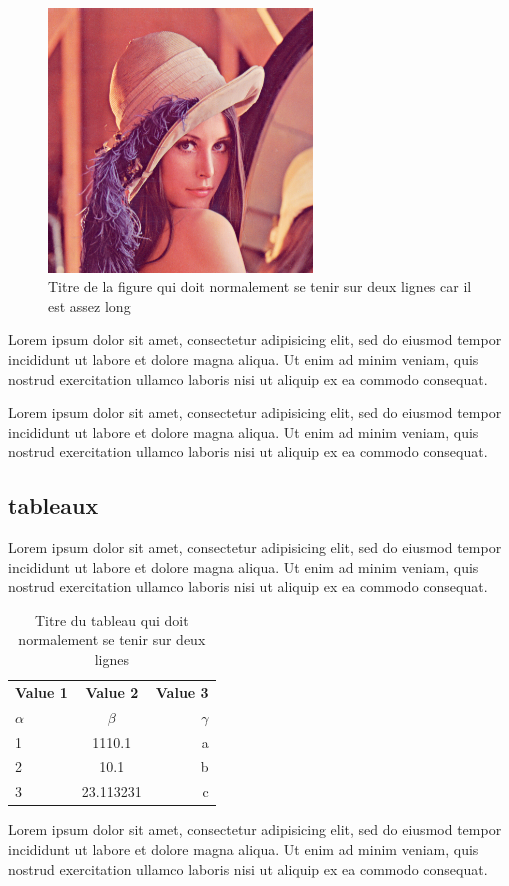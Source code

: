 \begin{figure}[H]
 \centering
 \includegraphics[width=7cm]{lenna.png}
 \caption{Titre de la figure qui doit normalement se tenir sur deux lignes car il est assez long}
 \label{fig:figure1}
\end{figure}

Lorem ipsum dolor sit amet, consectetur adipisicing elit, sed do eiusmod
tempor incididunt ut labore et dolore magna aliqua. Ut enim ad minim veniam,
quis nostrud exercitation ullamco laboris nisi ut aliquip ex ea commodo
consequat.

Lorem ipsum dolor sit amet, consectetur adipisicing elit, sed do eiusmod
tempor incididunt ut labore et dolore magna aliqua. Ut enim ad minim veniam,
quis nostrud exercitation ullamco laboris nisi ut aliquip ex ea commodo
consequat.

\subsection{tableaux}   

Lorem ipsum dolor sit amet, consectetur adipisicing elit, sed do eiusmod
tempor incididunt ut labore et dolore magna aliqua. Ut enim ad minim veniam,
quis nostrud exercitation ullamco laboris nisi ut aliquip ex ea commodo
consequat.

\begin{table}[H]
  \begin{center}
    \caption{Titre du tableau qui doit normalement se tenir sur deux lignes}
    \label{tab:table1}
    \begin{tabular}{l|c|r}
      \textbf{Value 1} & \textbf{Value 2} & \textbf{Value 3}\\
      $\alpha$ & $\beta$ & $\gamma$ \\
      \hline
      1 & 1110.1 & a\\
      2 & 10.1 & b\\
      3 & 23.113231 & c\\
    \end{tabular}
  \end{center}
\end{table}

Lorem ipsum dolor sit amet, consectetur adipisicing elit, sed do eiusmod
tempor incididunt ut labore et dolore magna aliqua. Ut enim ad minim veniam,
quis nostrud exercitation ullamco laboris nisi ut aliquip ex ea commodo
consequat.